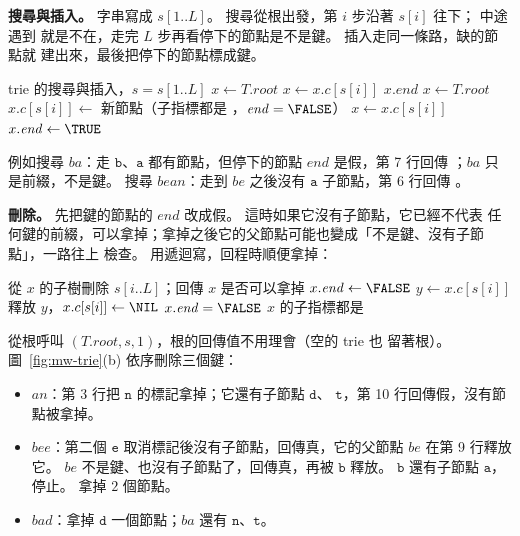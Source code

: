 \textbf{搜尋與插入。} 字串寫成 $s[1..L]$。 搜尋從根出發，第 $i$ 步沿著 $s[i]$ 往下；
中途遇到 \NIL 就是不在，走完 $L$ 步再看停下的節點是不是鍵。 插入走同一條路，缺的節點就
建出來，最後把停下的節點標成鍵。

\begin{pseudo}[label=alg:mw-trie, unbreakable]{trie 的搜尋與插入，$s = s[1..L]$}
    \State $x \gets T.\mathit{root}$
        \State $x \gets x.c[s[i]]$
            \State \Return \FALSE
        \EndIf
    \EndFor
    \State \Return $x.\mathit{end}$
\EndFunction
{}
    \State $x \gets T.\mathit{root}$
            \State $x.c[s[i]] \gets$ 新節點（子指標都是 \NIL，$\mathit{end} = \FALSE$）
        \EndIf
        \State $x \gets x.c[s[i]]$
    \EndFor
    \State $x.\mathit{end} \gets \TRUE$
\EndProcedure
\end{pseudo}

例如搜尋 $\mathit{ba}$：走 $\mathtt{b}$、$\mathtt{a}$ 都有節點，但停下的節點
$\mathit{end}$ 是假，第 7 行回傳 \FALSE；$\mathit{ba}$ 只是前綴，不是鍵。 搜尋
$\mathit{bean}$：走到 $\mathit{be}$ 之後沒有 $\mathtt{a}$ 子節點，第 6 行回傳 \FALSE。

\textbf{刪除。} 先把鍵的節點的 $\mathit{end}$ 改成假。 這時如果它沒有子節點，它已經不代表
任何鍵的前綴，可以拿掉；拿掉之後它的父節點可能也變成「不是鍵、沒有子節點」，一路往上
檢查。 用遞迴寫，回程時順便拿掉：

\begin{pseudo}[label=alg:mw-trie-del, unbreakable]{從 $x$ 的子樹刪除 $s[i..L]$；回傳 $x$ 是否可以拿掉}
        \State $x.\mathit{end} \gets \FALSE$
    \Else
        \State $y \gets x.c[s[i]]$
            \State \Return \FALSE {}
        \EndIf
            \State 釋放 $y$，$x.c[s[i]] \gets \NIL$
        \EndIf
    \EndIf
    \State \Return $x.\mathit{end} = \FALSE$ \AND $x$ 的子指標都是 \NIL
\EndFunction
\end{pseudo}

從根呼叫 $(T.\mathit{root}, s, 1)$，根的回傳值不用理會（空的 trie 也
留著根）。 圖~\ref{fig:mw-trie}(b) 依序刪除三個鍵：
\begin{itemize}
\item $\mathit{an}$：第 3 行把 $\mathtt{n}$ 的標記拿掉；它還有子節點 $\mathtt{d}$、
$\mathtt{t}$，第 10 行回傳假，沒有節點被拿掉。
\item $\mathit{bee}$：第二個 $\mathtt{e}$ 取消標記後沒有子節點，回傳真，它的父節點
$\mathit{be}$ 在第 9 行釋放它。 $\mathit{be}$ 不是鍵、也沒有子節點了，回傳真，再被
$\mathtt{b}$ 釋放。 $\mathtt{b}$ 還有子節點 $\mathtt{a}$，停止。 拿掉 $2$ 個節點。
\item $\mathit{bad}$：拿掉 $\mathtt{d}$ 一個節點；$\mathit{ba}$ 還有 $\mathtt{n}$、$\mathtt{t}$。
\end{itemize}

